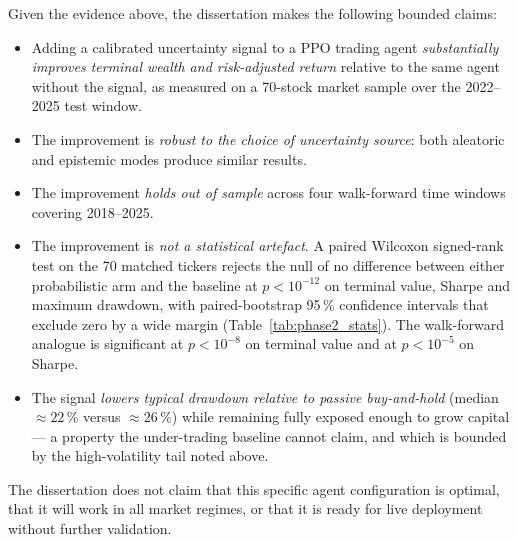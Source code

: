 Given the evidence above, the dissertation makes the following bounded claims:

\begin{itemize}[leftmargin=*]
  \item Adding a calibrated uncertainty signal to a PPO trading agent \emph{substantially improves terminal wealth and risk-adjusted return} relative to the same agent without the signal, as measured on a 70-stock market sample over the 2022--2025 test window.
  \item The improvement is \emph{robust to the choice of uncertainty source}: both aleatoric and epistemic modes produce similar results.
  \item The improvement \emph{holds out of sample} across four walk-forward time windows covering 2018--2025.
  \item The improvement is \emph{not a statistical artefact}. A paired Wilcoxon signed-rank test on the 70 matched tickers rejects the null of no difference between either probabilistic arm and the baseline at $p < 10^{-12}$ on terminal value, Sharpe and maximum drawdown, with paired-bootstrap 95\,\% confidence intervals that exclude zero by a wide margin (Table~\ref{tab:phase2_stats}). The walk-forward analogue is significant at $p < 10^{-8}$ on terminal value and at $p < 10^{-5}$ on Sharpe.
  \item The signal \emph{lowers typical drawdown relative to passive buy-and-hold} (median $\approx 22\,\%$ versus $\approx 26\,\%$) while remaining fully exposed enough to grow capital --- a property the under-trading baseline cannot claim, and which is bounded by the high-volatility tail noted above.
\end{itemize}

The dissertation does not claim that this specific agent configuration is optimal, that it will work in all market regimes, or that it is ready for live deployment without further validation.
